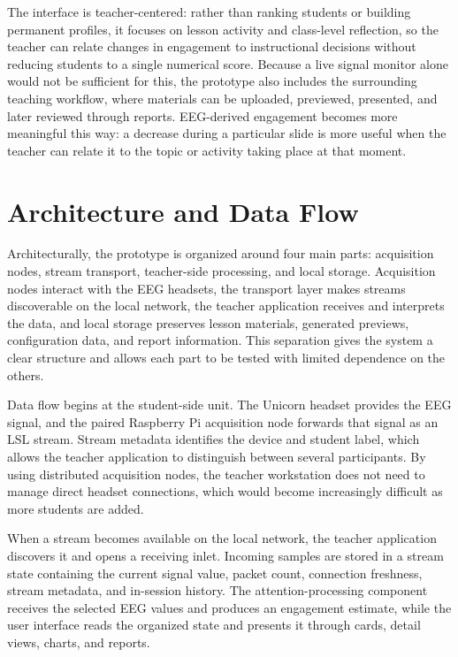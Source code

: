The interface is teacher-centered: rather than ranking students or building permanent profiles, it focuses on lesson activity and class-level reflection, so the teacher can relate changes in engagement to instructional decisions without reducing students to a single numerical score. Because a live signal monitor alone would not be sufficient for this, the prototype also includes the surrounding teaching workflow, where materials can be uploaded, previewed, presented, and later reviewed through reports. EEG-derived engagement becomes more meaningful this way: a decrease during a particular slide is more useful when the teacher can relate it to the topic or activity taking place at that moment.

\section{Architecture and Data Flow}\label{sect:archndf}
Architecturally, the prototype is organized around four main parts: acquisition nodes, stream transport, teacher-side processing, and local storage. Acquisition nodes interact with the EEG headsets, the transport layer makes streams discoverable on the local network, the teacher application receives and interprets the data, and local storage preserves lesson materials, generated previews, configuration data, and report information. This separation gives the system a clear structure and allows each part to be tested with limited dependence on the others.


Data flow begins at the student-side unit. The Unicorn headset provides the EEG signal, and the paired Raspberry Pi acquisition node forwards that signal as an LSL stream. Stream metadata identifies the device and student label, which allows the teacher application to distinguish between several participants. By using distributed acquisition nodes, the teacher workstation does not need to manage direct headset connections, which would become increasingly difficult as more students are added.


When a stream becomes available on the local network, the teacher application discovers it and opens a receiving inlet. Incoming samples are stored in a stream state containing the current signal value, packet count, connection freshness, stream metadata, and in-session history. The attention-processing component receives the selected EEG values and produces an engagement estimate, while the user interface reads the organized state and presents it through cards, detail views, charts, and reports.


